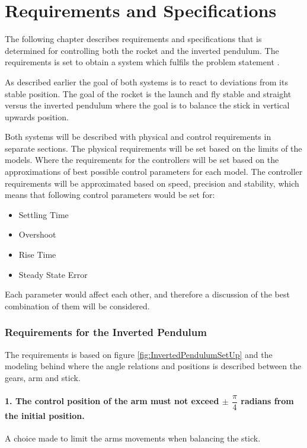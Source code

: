 \chapter{Requirements and Specifications}
The following chapter describes requirements and specifications that is determined for controlling both the rocket and the inverted pendulum. The requirements is set to obtain a system which fulfils the problem statement .

As described earlier the goal of both systems is to react to deviations from its stable position. The goal of the rocket is the launch and fly stable and straight versus the inverted pendulum where the goal is to balance the stick in vertical upwards position.  

Both systems will be described with physical and control requirements in separate sections. The physical requirements will be set based on the limits of the models. Where the requirements for the controllers will be set based on the approximations of best possible control parameters for each model.  
The controller requirements will be approximated based on speed, precision and stability, which means that following control parameters would be set for:

\begin{itemize}[noitemsep]
\item Settling Time
\item Overshoot
\item Rise Time
\item Steady State Error
\end{itemize}

Each parameter would affect each other, and therefore a discussion of the best combination of them will be considered.

\subsection{Requirements for the Inverted Pendulum}
The requirements is based on figure \ref{fig:InvertedPendulumSetUp} and the modeling behind where the angle relations and positions is described between the gears, arm and stick. 

\setlength{\parindent}{0pt}
\newcommand{\forceindent}{\leavevmode{\parindent=1em\indent}}

\subsubsection*{1. The control position of the arm must not exceed $\pm$ $\dfrac{\pi}{4}$ radians from the initial position.}
\forceindent A choice made to limit the arms movements when balancing the stick.


